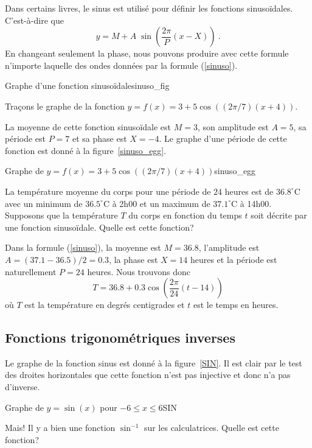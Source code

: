 {Dans certains livres, le sinus est utilisé pour définir les fonctions
sinusoïdales.  C'est-à-dire que
\[
y = M + A\;\sin\left(\frac{2\pi}{P}\left(x-X\right)\right) \ .
\]
En changeant seulement la phase, nous pouvons produire avec cette
formule n'importe laquelle des ondes données par la formule
(\ref{sinuso}).

{Graphe d'une fonction sinusoïdale}{sinuso_fig}

\begin{egg}
Traçons le graphe de la fonction $y=f(x) = 3+5 \cos((2\pi/7)(x+4))$.

La moyenne de cette fonction sinusoïdale est $M=3$, son amplitude est
$A=5$, sa période est $P=7$ et sa phase est $X=-4$.  Le graphe d'une
période de cette fonction est donné à la figure~\ref{sinuso_egg}.
\end{egg}

{Graphe de $y=f(x) = 3+5 \cos((2\pi/7)(x+4))$}{sinuso_egg}

\begin{egg}
La température moyenne du corps pour une période de $24$
heures est de $36.8^\circ$C avec un minimum de $36.5^\circ$C à 2h00 et
un maximum de $37.1^\circ$C à 14h00.  Supposons que la
température $T$ du corps en fonction du temps $t$ soit décrite par
une fonction sinusoïdale.   Quelle est cette fonction?

Dans la formule (\ref{sinuso}), la moyenne est $M=36.8$, l'amplitude
est $A=(37.1-36.5)/2 = 0.3$, la phase est $X=14$ heures et la période
est naturellement $P=24$ heures.  Nous trouvons donc
\[
T = 36.8 + 0.3 \cos\left(\frac{2\pi}{24}(t-14)\right)
\]
où $T$ est la température en degrés centigrades et $t$ est le temps en
heures.
\end{egg}

\subsection{Fonctions trigonométriques inverses}

Le graphe de la fonction sinus est donné à la figure~\ref{SIN}.  Il
est clair par le test des droites horizontales que cette fonction
n'est pas injective et donc n'a pas d'inverse.

{Graphe de $y=\sin(x)$ pour $-6 \leq x \leq 6$}{SIN}

Mais! Il y a bien une fonction $\sin^{-1}$ sur les calculatrices.
Quelle est cette fonction?

}
